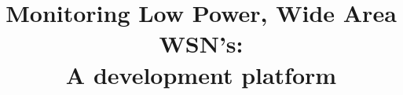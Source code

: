 \documentclass[a4paper, 10pt, conference]{report}
\begin{document}
\title{Monitoring Low Power, Wide Area WSN's:\\A development platform}
\maketitle
\newpage
\tableofcontents
\newpage






\end{document}
